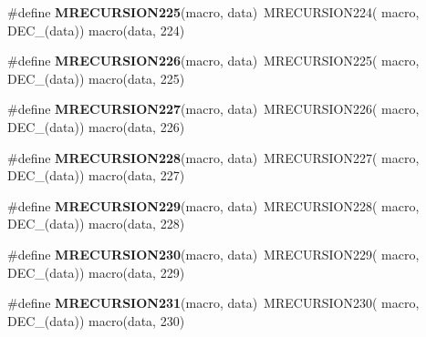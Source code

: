\begin{DoxyCompactItemize}
\item 
\hypertarget{group__group__sam0__utils__mrecursion_ga3affdcfd205e62f470e944888854dd5e}{}\#define {\bfseries M\+R\+E\+C\+U\+R\+S\+I\+O\+N225}(macro,  data)~M\+R\+E\+C\+U\+R\+S\+I\+O\+N224(  macro, D\+E\+C\+\_\+(data))   macro(data, 224)\label{group__group__sam0__utils__mrecursion_ga3affdcfd205e62f470e944888854dd5e}

\item 
\hypertarget{group__group__sam0__utils__mrecursion_ga98d3f68511230e8b1e541db7cd93f59d}{}\#define {\bfseries M\+R\+E\+C\+U\+R\+S\+I\+O\+N226}(macro,  data)~M\+R\+E\+C\+U\+R\+S\+I\+O\+N225(  macro, D\+E\+C\+\_\+(data))   macro(data, 225)\label{group__group__sam0__utils__mrecursion_ga98d3f68511230e8b1e541db7cd93f59d}

\item 
\hypertarget{group__group__sam0__utils__mrecursion_ga45b814bc93f1a82ae4f18566beedb453}{}\#define {\bfseries M\+R\+E\+C\+U\+R\+S\+I\+O\+N227}(macro,  data)~M\+R\+E\+C\+U\+R\+S\+I\+O\+N226(  macro, D\+E\+C\+\_\+(data))   macro(data, 226)\label{group__group__sam0__utils__mrecursion_ga45b814bc93f1a82ae4f18566beedb453}

\item 
\hypertarget{group__group__sam0__utils__mrecursion_ga47235a08705017eeeaef3b229f9c92db}{}\#define {\bfseries M\+R\+E\+C\+U\+R\+S\+I\+O\+N228}(macro,  data)~M\+R\+E\+C\+U\+R\+S\+I\+O\+N227(  macro, D\+E\+C\+\_\+(data))   macro(data, 227)\label{group__group__sam0__utils__mrecursion_ga47235a08705017eeeaef3b229f9c92db}

\item 
\hypertarget{group__group__sam0__utils__mrecursion_gaec897a7f62aa5fef50018148adf089bb}{}\#define {\bfseries M\+R\+E\+C\+U\+R\+S\+I\+O\+N229}(macro,  data)~M\+R\+E\+C\+U\+R\+S\+I\+O\+N228(  macro, D\+E\+C\+\_\+(data))   macro(data, 228)\label{group__group__sam0__utils__mrecursion_gaec897a7f62aa5fef50018148adf089bb}

\item 
\hypertarget{group__group__sam0__utils__mrecursion_ga4eeac3211fea63e6fe6eb6b32b6fbc89}{}\#define {\bfseries M\+R\+E\+C\+U\+R\+S\+I\+O\+N230}(macro,  data)~M\+R\+E\+C\+U\+R\+S\+I\+O\+N229(  macro, D\+E\+C\+\_\+(data))   macro(data, 229)\label{group__group__sam0__utils__mrecursion_ga4eeac3211fea63e6fe6eb6b32b6fbc89}

\item 
\hypertarget{group__group__sam0__utils__mrecursion_ga924bf3ce6728e48c4ef04ba0bc5f0707}{}\#define {\bfseries M\+R\+E\+C\+U\+R\+S\+I\+O\+N231}(macro,  data)~M\+R\+E\+C\+U\+R\+S\+I\+O\+N230(  macro, D\+E\+C\+\_\+(data))   macro(data, 230)\label{group__group__sam0__utils__mrecursion_ga924bf3ce6728e48c4ef04ba0bc5f0707}


\end{DoxyCompactItemize}

